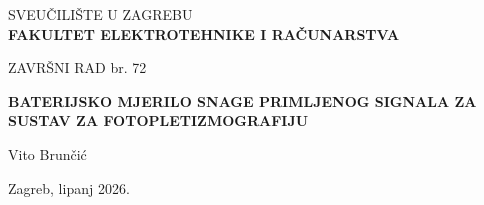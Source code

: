 \documentclass[12pt, a4paper, oneside]{report}
\begin{document}
\begin{titlepage}
    \begin{center}
        
        \Large SVEUČILIŠTE U ZAGREBU \\[0.2cm]
        \textbf{\Large FAKULTET ELEKTROTEHNIKE I RAČUNARSTVA}
        
        \vfill %
        
        \large ZAVRŠNI RAD br. 72
        
        \vspace{2cm}
        
        \textbf{\huge BATERIJSKO MJERILO SNAGE PRIMLJENOG SIGNALA ZA SUSTAV ZA FOTOPLETIZMOGRAFIJU} \\[0.3cm]
        
        \vspace{1.5cm}
        
        \large Vito Brunčić
        
        \vfill %
        
        \large Zagreb, lipanj 2026. %
        
    \end{center}
\end{titlepage}

\onehalfspacing 
\newpage
\end{document}
